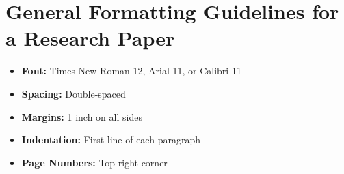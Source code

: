 \documentclass[12pt]{article}
\begin{document}
\section*{General Formatting Guidelines for a Research Paper}

\begin{itemize}
  \item \textbf{Font:} Times New Roman 12, Arial 11, or Calibri 11
  \item \textbf{Spacing:} Double-spaced
  \item \textbf{Margins:} 1 inch on all sides
  \item \textbf{Indentation:} First line of each paragraph
  \item \textbf{Page Numbers:} Top-right corner
\end{itemize}
\end{document}

